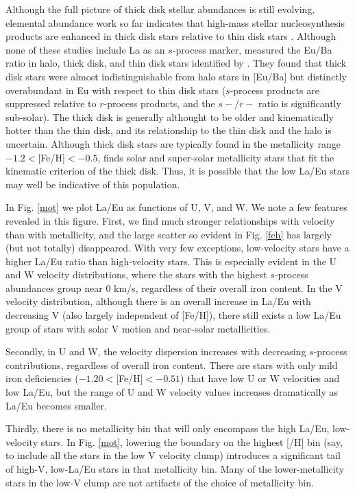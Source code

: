 \documentclass[12pt,preprint]{aastex}
\begin{document}
{ Although the full picture of thick disk stellar abundances is still evolving, elemental abundance work so far indicates that high-mass stellar nucleosynthesis products are enhanced in thick disk stars relative to thin disk stars \citep{Fuhrmann1998, Prochaska2000, Reddy2003, Mashonkina2003}.  Although none of these studies include La as an $s$-process marker, \citet{Mashonkina2003} measured the Eu/Ba ratio in halo, thick disk, and thin disk stars identified by \citet{Fuhrmann1998}.  They found that thick disk stars were almost indistinguishable from halo stars in [Eu/Ba] but distinctly overabundant in Eu with respect to thin disk stars ($s$-process products are suppressed relative to $r$-process products, and the $s-/r-$ ratio is significantly sub-solar).  The thick disk is generally althought to be older and kinematically hotter than the thin disk, and its relationship to the thin disk and the halo is uncertain.  Although thick disk stars are typically found in the metallicity range  $-1.2<$[Fe/H]$<-0.5$, \citet{Bensby2003} finds solar and super-solar metallicity stars that fit the kinematic criterion of the thick disk.  Thus, it is possible that the low La/Eu stars may well be indicative of this population. 


In Fig. \ref{mot} we plot La/Eu as functions of U, V, and W.   We note a few features revealed in this figure.  First, we find much stronger relationships with velocity than with metallicity, and the large scatter so evident in Fig. \ref{feh} has largely (but not totally) disappeared. With very few exceptions, low-velocity stars have a higher La/Eu ratio than high-velocity stars.  This is especially evident in the U and W velocity distributions, where the stars with the highest $s$-process abundances group near 0 km/s, regardless of their overall iron content.  In the V velocity distribution, although there is an overall increase in La/Eu with decreasing V (also largely independent of [Fe/H]), there still exists a low La/Eu group of stars with solar V motion and near-solar metallicities.
 
Secondly, in U and W, the velocity dispersion increases with decreasing $s$-process contributions, regardless of overall iron content.  There are stars with only mild iron deficiencies ($-1.20<$[Fe/H]$<-0.51$) that have low U or W velocities and low La/Eu, but the range of U and W velocity values increases dramatically as La/Eu becomes smaller.

Thirdly, there is no metallicity bin that will only encompass the high La/Eu, low-velocity stars.  In Fig. \ref{mot}, lowering the boundary on the highest [/H] bin (say, to include all the stars in the low V velocity clump) introduces a significant tail of high-V, low-La/Eu stars in that metallicity bin.  Many of the lower-metallicity stars in the low-V clump are not artifacts of the choice of metallicity bin.

}
\end{document}
